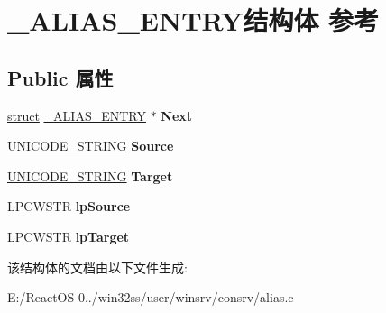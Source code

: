 \hypertarget{struct___a_l_i_a_s___e_n_t_r_y}{}\section{\+\_\+\+A\+L\+I\+A\+S\+\_\+\+E\+N\+T\+R\+Y结构体 参考}
\label{struct___a_l_i_a_s___e_n_t_r_y}
\subsection*{Public 属性}
\begin{DoxyCompactItemize}
\item 
\mbox{\label{struct___a_l_i_a_s___e_n_t_r_y_a202efbe590cf11797e48adc3582a2d76}} 
\hyperlink{interfacestruct}{struct} \hyperlink{struct___a_l_i_a_s___e_n_t_r_y}{\+\_\+\+A\+L\+I\+A\+S\+\_\+\+E\+N\+T\+RY} $\ast$ {\bfseries Next}
\item 
\mbox{\label{struct___a_l_i_a_s___e_n_t_r_y_adedf037a3fa21133b60d3a1bcaabd1e7}} 
\hyperlink{struct___u_n_i_c_o_d_e___s_t_r_i_n_g}{U\+N\+I\+C\+O\+D\+E\+\_\+\+S\+T\+R\+I\+NG} {\bfseries Source}
\item 
\mbox{\label{struct___a_l_i_a_s___e_n_t_r_y_a3c51c8f2d85a84b097042673c1d8f0ad}} 
\hyperlink{struct___u_n_i_c_o_d_e___s_t_r_i_n_g}{U\+N\+I\+C\+O\+D\+E\+\_\+\+S\+T\+R\+I\+NG} {\bfseries Target}
\item 
\mbox{\label{struct___a_l_i_a_s___e_n_t_r_y_a38b4525efe34fd33e1eee92e45c71a86}} 
L\+P\+C\+W\+S\+TR {\bfseries lp\+Source}
\item 
\mbox{\label{struct___a_l_i_a_s___e_n_t_r_y_a1c90fd401f2656b8a1916a568577ec71}} 
L\+P\+C\+W\+S\+TR {\bfseries lp\+Target}
\end{DoxyCompactItemize}


该结构体的文档由以下文件生成\+:\begin{DoxyCompactItemize}
\item 
E\+:/\+React\+O\+S-\/0../win32ss/user/winsrv/consrv/alias.\+c\end{DoxyCompactItemize}

